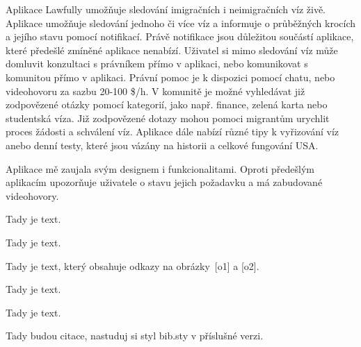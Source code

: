 Aplikace Lawfully umožňuje sledování imigračních i neimigračních víz živě. Aplikace umožňuje sledování jednoho či více víz a informuje o průběžných krocích a jejího stavu pomocí notifikací. Právě notifikace jsou důležitou součástí aplikace, které předešlé zmíněné aplikace nenabízí. Uživatel si mimo sledování víz může domluvit konzultaci s právníkem přímo v aplikaci, nebo komunikovat s komunitou přímo v aplikaci. Právní pomoc je k dispozici pomocí chatu, nebo videohovoru za sazbu 20-100 \$/h. V komunitě je možné vyhledávat již zodpovězené otázky pomocí kategorií, jako např. finance, zelená karta nebo studentská víza. Již zodpovězené dotazy mohou pomoci migrantům urychlit proces žádosti a schválení víz. Aplikace dále nabízí různé tipy k vyřizování víz anebo denní testy, které jsou vázány na historii a celkové fungování USA.
\par
Aplikace mě zaujala svým designem i funkcionalitami. Oproti předešlým aplikacím upozorňuje uživatele o stavu jejich požadavku a má zabudované videohovory.
























Tady je text.


Tady je text.


Tady je text, který obsahuje odkazy na obrázky~\in{}[o1] a \in{}[o2].




Tady je text.


Tady je text.


\bbib
Tady budou citace, nastuduj si styl bib.sty v příslušné verzi.
\ebib

